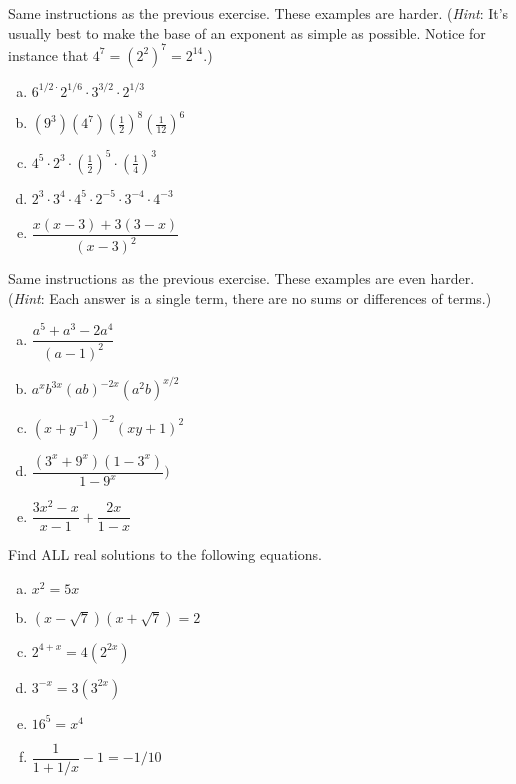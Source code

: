 \begin{exercise}{8}
Same instructions as the previous exercise. These examples are  harder. (\emph{Hint}: It's usually best to make the base of an exponent as simple as possible. Notice for instance that $4^7 = (2^2)^7 = 2^{14}$.)
\begin{multicols}{2}
\begin{enumerate}[(a)]
\item
$6^{1/2\cdot}2^{1/6}\cdot3^{3/2}\cdot2^{1/3}$
\item
$(9^3)(4^7)\left(\frac{1}{2}\right)^8\left(\frac{1}{12}\right)^6$
\item
$4^5 \cdot 2^3 \cdot \left(\frac{1}{2}\right)^5 \cdot \left( \frac{1}{4} \right) ^3$
\item
$2^3 \cdot 3^4 \cdot 4^5 \cdot 2^{-5} \cdot 3^{-4} \cdot 4^{-3}$
\item
$\dfrac{x(x-3)+3(3-x)}{(x-3)^2}$
\end{enumerate}
\end{multicols}
\end{exercise}


\begin{exercise}{9}
Same instructions as the previous exercise. These examples are even harder. (\emph{Hint}: Each answer is a single term, there are no sums or differences of terms.)
\begin{multicols}{2}
\begin{enumerate}[(a)]
\item
$\dfrac{a^5 +a^3 - 2a^4}{(a-1)^2}$
\item
$a^x b^{3x}(ab)^{-2x}(a^2 b)^{x/2}$
\item
$(x+y^{-1})^{-2}(xy+1)^2$
\item
$\dfrac{(3^x+9^x)(1-3^x)}{1-9^x})$
\item
$\dfrac{3x^2 - x}{x-1} + \dfrac{2x}{1-x}$

\end{enumerate}
\end{multicols}
\end{exercise}

\begin{exercise}{10}
Find ALL  real solutions to the following equations. 
\begin{multicols}{2}
\begin{enumerate}[(a)]
\item
$x^2 = 5x$
\item
$(x - \sqrt{7})(x+\sqrt{7}) = 2$
\item
$2^{4+x} = 4(2^{2x})$
\item
$3^{-x} = 3(3^{2x})$
\item
$16^5 = x^4$
\item
$\dfrac{1}{1 + 1/x} -1= -1/10$
\end{enumerate}
\end{multicols}
\end{exercise}
